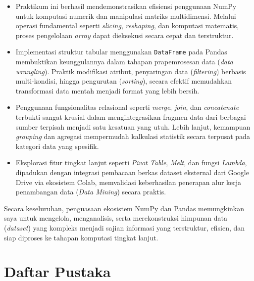 \begin{itemize}
    \item Praktikum ini berhasil mendemonstrasikan efisiensi penggunaan NumPy untuk komputasi numerik dan manipulasi matriks multidimensi. Melalui operasi fundamental seperti \textit{slicing}, \textit{reshaping}, dan komputasi matematis, proses pengelolaan \textit{array} dapat dieksekusi secara cepat dan terstruktur.
    
    \item Implementasi struktur tabular menggunakan \texttt{DataFrame} pada Pandas membuktikan keunggulannya dalam tahapan prapemrosesan data (\textit{data wrangling}). Praktik modifikasi atribut, penyaringan data (\textit{filtering}) berbasis multi-kondisi, hingga pengurutan (\textit{sorting}), secara efektif memudahkan transformasi data mentah menjadi format yang lebih bersih.
    
    \item Penggunaan fungsionalitas relasional seperti \textit{merge}, \textit{join}, dan \textit{concatenate} terbukti sangat krusial dalam mengintegrasikan fragmen data dari berbagai sumber terpisah menjadi satu kesatuan yang utuh. Lebih lanjut, kemampuan \textit{grouping} dan agregasi mempermudah kalkulasi statistik secara terpusat pada kategori data yang spesifik.
    
    \item Eksplorasi fitur tingkat lanjut seperti \textit{Pivot Table}, \textit{Melt}, dan fungsi \textit{Lambda}, dipadukan dengan integrasi pembacaan berkas dataset eksternal dari Google Drive via ekosistem Colab, memvalidasi keberhasilan penerapan alur kerja penambangan data (\textit{Data Mining}) secara praktis.
\end{itemize}

Secara keseluruhan, penguasaan ekosistem NumPy dan Pandas memungkinkan saya untuk mengelola, menganalisis, serta merekonstruksi himpunan data (\textit{dataset}) yang kompleks menjadi sajian informasi yang terstruktur, efisien, dan siap diproses ke tahapan komputasi tingkat lanjut.

\chapter{Daftar Pustaka}

